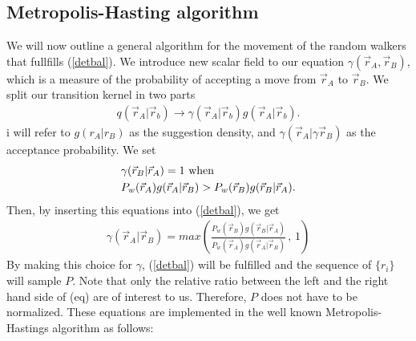 \documentclass[a4paper,10pt,twocolumn]{article} %
\begin{document}
\subsection{Metropolis-Hasting algorithm}%
We will now outline a general algorithm for the movement of the random walkers that fullfills (\ref{detbal}).
We introduce new scalar field to our equation $\gamma(\vec r_A,\vec r_B)$, which is a measure of the 
probability of accepting a move from $\vec r_A$ to $\vec r_B$.
We split our transition kernel in two parts
\begin{align}
	q(\vec r_A|\vec r_b) 
		\to 
	\gamma(\vec r_A|\vec r_b)
	g(\vec r_A|\vec r_b).
\end{align} 
i will refer to $g(r_A|r_B)$ as the suggestion density, and $\gamma(\vec r_A|\gamma \vec r_B)$ as the acceptance probability. We set
\begin{align}
&\gamma(\vec r_B|\vec r_A)=1 \text{ when }\notag\\
    &P_w(\vec r_A) g(\vec r_A|\vec r_B)  >  P_w(\vec r_B) g(\vec r_B|\vec r_A).
\end{align}
Then, by inserting this equations into (\ref{detbal}), we get
\begin{align} 
	\gamma(\vec r_A|\vec r_B)=max\left(
	\frac
	{P_w(\vec r_B) g(\vec r_B|\vec r_A)}
    {P_w(\vec r_A) g(\vec r_A|\vec r_B)}\, 
	,\, 1 \right) \label{gamma}
\end{align}
By making this choice for $\gamma$, (\ref{detbal}) will be fulfilled and the sequence of $\{r_i\}$ will sample 
$P$. 
Note that only the relative ratio between the left and the right hand side of (eq) are 
of interest to us. Therefore, $P$ does not have to be normalized. 
These equations are implemented in the well known Metropolis-Hastings algorithm as follows:
%
\begin{algorithmic}
\LOOP{}
\ELSE
{}
\ENDIF{}
\ENDLOOP{}
\end{algorithmic}
%
\end{document}
